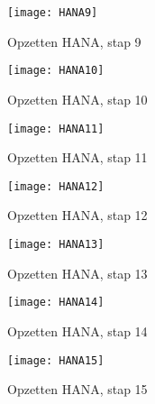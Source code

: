             \begin{figure}	
                \centering
                \texttt{[image: HANA9]}
                \caption{Opzetten HANA, stap 9} \label{HANA9}
            \end{figure}
            
            \begin{figure}	
                \centering
                \texttt{[image: HANA10]}
                \caption{Opzetten HANA, stap 10} \label{HANA10}
            \end{figure}
            
            \begin{figure}	
                \centering
                \texttt{[image: HANA11]}
                \caption{Opzetten HANA, stap 11} \label{HANA11}
            \end{figure}
            
            \begin{figure}	
                \centering
                \texttt{[image: HANA12]}
                \caption{Opzetten HANA, stap 12} \label{HANA12}
            \end{figure}
        
            \begin{figure}	
                \centering
                \texttt{[image: HANA13]}
                \caption{Opzetten HANA, stap 13} \label{HANA13}
            \end{figure}
            
            \begin{figure}	
                \centering
                \texttt{[image: HANA14]}
                \caption{Opzetten HANA, stap 14} \label{HANA14}
            \end{figure}
            
            \begin{figure}	
                \centering
                \texttt{[image: HANA15]}
                \caption{Opzetten HANA, stap 15} \label{HANA15}
            \end{figure}
           
